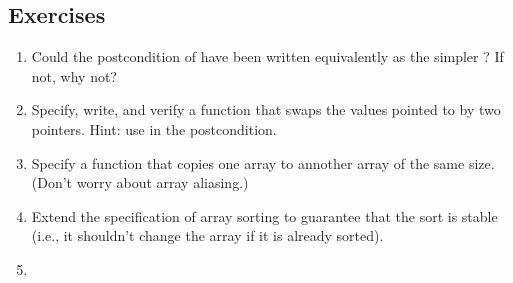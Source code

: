 \subsection*{Exercises}
\begin{enumerate}
\item
Could the postcondition of  have been written equivalently
as the simpler ? If not, why not?
\item
Specify, write, and verify a function that swaps the values pointed to
by two  pointers. Hint: use  in the
postcondition.
\item
Specify a function that copies one array to annother array of the same
size. (Don't worry about array aliasing.)
\item
Extend the specification of array sorting to guarantee that the sort
is stable (i.e., it shouldn't change the array if it is already
sorted).  
\item
\end{enumerate}


